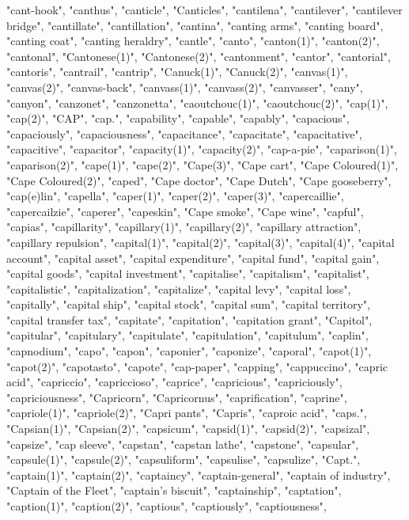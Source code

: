 "cant-hook",
"canthus",
"canticle",
"Canticles",
"cantilena",
"cantilever",
"cantilever bridge",
"cantillate",
"cantillation",
"cantina",
"canting arms",
"canting board",
"canting coat",
"canting heraldry",
"cantle",
"canto",
"canton(1)",
"canton(2)",
"cantonal",
"Cantonese(1)",
"Cantonese(2)",
"cantonment",
"cantor",
"cantorial",
"cantoris",
"cantrail",
"cantrip",
"Canuck(1)",
"Canuck(2)",
"canvas(1)",
"canvas(2)",
"canvas-back",
"canvass(1)",
"canvass(2)",
"canvasser",
"cany",
"canyon",
"canzonet",
"canzonetta",
"caoutchouc(1)",
"caoutchouc(2)",
"cap(1)",
"cap(2)",
"CAP",
"cap.",
"capability",
"capable",
"capably",
"capacious",
"capaciously",
"capaciousness",
"capacitance",
"capacitate",
"capacitative",
"capacitive",
"capacitor",
"capacity(1)",
"capacity(2)",
"cap-a-pie",
"caparison(1)",
"caparison(2)",
"cape(1)",
"cape(2)",
"Cape(3)",
"Cape cart",
"Cape Coloured(1)",
"Cape Coloured(2)",
"caped",
"Cape doctor",
"Cape Dutch",
"Cape gooseberry",
"cap(e)lin",
"capella",
"caper(1)",
"caper(2)",
"caper(3)",
"capercaillie",
"capercailzie",
"caperer",
"capeskin",
"Cape smoke",
"Cape wine",
"capful",
"capias",
"capillarity",
"capillary(1)",
"capillary(2)",
"capillary attraction",
"capillary repulsion",
"capital(1)",
"capital(2)",
"capital(3)",
"capital(4)",
"capital account",
"capital asset",
"capital expenditure",
"capital fund",
"capital gain",
"capital goods",
"capital investment",
"capitalise",
"capitalism",
"capitalist",
"capitalistic",
"capitalization",
"capitalize",
"capital levy",
"capital loss",
"capitally",
"capital ship",
"capital stock",
"capital sum",
"capital territory",
"capital transfer tax",
"capitate",
"capitation",
"capitation grant",
"Capitol",
"capitular",
"capitulary",
"capitulate",
"capitulation",
"capitulum",
"caplin",
"capnodium",
"capo",
"capon",
"caponier",
"caponize",
"caporal",
"capot(1)",
"capot(2)",
"capotasto",
"capote",
"cap-paper",
"capping",
"cappuccino",
"capric acid",
"capriccio",
"capriccioso",
"caprice",
"capricious",
"capriciously",
"capriciousness",
"Capricorn",
"Capricornus",
"caprification",
"caprine",
"capriole(1)",
"capriole(2)",
"Capri pants",
"Capris",
"caproic acid",
"caps.",
"Capsian(1)",
"Capsian(2)",
"capsicum",
"capsid(1)",
"capsid(2)",
"capsizal",
"capsize",
"cap sleeve",
"capstan",
"capstan lathe",
"capstone",
"capsular",
"capsule(1)",
"capsule(2)",
"capsuliform",
"capsulise",
"capsulize",
"Capt.",
"captain(1)",
"captain(2)",
"captaincy",
"captain-general",
"captain of industry",
"Captain of the Fleet",
"captain's biscuit",
"captainship",
"captation",
"caption(1)",
"caption(2)",
"captious",
"captiously",
"captiousness",
